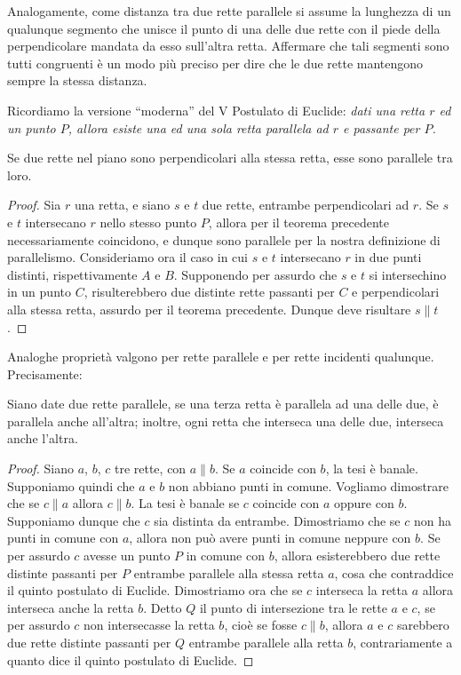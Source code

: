 Analogamente, come distanza tra due rette parallele si assume la lunghezza di un qualunque segmento che unisce il punto di una delle due rette con il piede della perpendicolare mandata da esso sull'altra retta. Affermare che tali segmenti sono tutti congruenti è un modo più preciso per dire che le due rette mantengono sempre la stessa distanza.

Ricordiamo la versione ``moderna'' del V Postulato di Euclide: \emph{dati una retta $r$ ed un punto $P$, allora esiste una ed una sola retta parallela ad $r$ e passante per $P$.}

\begin{proposizione}
Se due rette nel piano sono perpendicolari alla stessa retta, esse sono parallele tra loro.
\end{proposizione}


\begin{proof}
Sia $r$ una retta, e siano $s$ e $t$ due rette, entrambe perpendicolari ad $r$. 
Se $s$ e $t$ intersecano $r$ nello stesso punto $P$, allora per il teorema precedente necessariamente coincidono, e dunque sono parallele per la nostra definizione di parallelismo. 
Consideriamo ora il caso in cui $s$ e $t$ intersecano $r$ in due punti distinti, rispettivamente $A$ e $B$. Supponendo per assurdo che $s$ e $t$ si intersechino in un punto $C$, risulterebbero due distinte rette passanti per $C$ e perpendicolari alla stessa retta, assurdo per il teorema precedente. Dunque deve risultare $s\parallel t$.
\end{proof}

Analoghe proprietà valgono per rette parallele e per rette incidenti qualunque. Precisamente:
\begin{proposizione}
Siano date due rette parallele, se una terza retta è parallela ad una delle due, è parallela anche all'altra; inoltre, ogni retta che interseca una delle due, interseca anche l'altra.
\end{proposizione}


\begin{proof}
Siano $a$, $b$, $c$ tre rette, con $a\parallel b$. Se $a$ coincide con $b$, la tesi è banale. Supponiamo quindi che $a$ e $b$ non abbiano punti in comune.
Vogliamo dimostrare che se $c\parallel a$ allora $c\parallel b$.
La tesi è banale se $c$ coincide con $a$ oppure con $b$.
Supponiamo dunque che $c$ sia distinta da entrambe.
Dimostriamo che se $c$ non ha punti in comune con $a$, allora non può avere punti in comune neppure con $b$. Se per assurdo $c$ avesse un punto $P$ in comune con $b$, allora esisterebbero due rette distinte passanti per $P$ entrambe parallele alla stessa retta $a$, cosa che contraddice il quinto postulato di Euclide.
Dimostriamo ora che se $c$ interseca la retta $a$ allora interseca anche la retta $b$. Detto $Q$ il punto di intersezione tra le rette $a$ e $c$, se per assurdo $c$ non intersecasse la retta $b$, cioè se fosse $c\parallel b$, allora $a$ e $c$ sarebbero due rette distinte passanti per $Q$ entrambe parallele alla retta $b$, contrariamente a quanto dice il quinto postulato di Euclide.
\end{proof}

